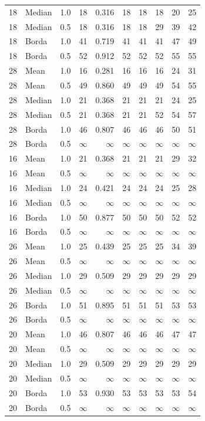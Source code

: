 \documentclass{article}
\begin{document}
\begin{longtable}{llrrr rr r rr}
18 & Median & 1.0 & 18 & 0.316 & 18 & 18 & 18 & 20 & 25 \\
18 & Median & 0.5 & 18 & 0.316 & 18 & 18 & 29 & 39 & 42 \\
18 & Borda & 1.0 & 41 & 0.719 & 41 & 41 & 41 & 47 & 49 \\
18 & Borda & 0.5 & 52 & 0.912 & 52 & 52 & 52 & 55 & 55 \\
28 & Mean & 1.0 & 16 & 0.281 & 16 & 16 & 16 & 24 & 31 \\
28 & Mean & 0.5 & 49 & 0.860 & 49 & 49 & 49 & 54 & 55 \\
28 & Median & 1.0 & 21 & 0.368 & 21 & 21 & 21 & 24 & 25 \\
28 & Median & 0.5 & 21 & 0.368 & 21 & 21 & 52 & 54 & 57 \\
28 & Borda & 1.0 & 46 & 0.807 & 46 & 46 & 46 & 50 & 51 \\
28 & Borda & 0.5 & $\infty$ & $\infty$ & $\infty$ & $\infty$ & $\infty$ & $\infty$ & $\infty$ \\
16 & Mean & 1.0 & 21 & 0.368 & 21 & 21 & 21 & 29 & 32 \\
16 & Mean & 0.5 & $\infty$ & $\infty$ & $\infty$ & $\infty$ & $\infty$ & $\infty$ & $\infty$ \\
16 & Median & 1.0 & 24 & 0.421 & 24 & 24 & 24 & 25 & 28 \\
16 & Median & 0.5 & $\infty$ & $\infty$ & $\infty$ & $\infty$ & $\infty$ & $\infty$ & $\infty$ \\
16 & Borda & 1.0 & 50 & 0.877 & 50 & 50 & 50 & 52 & 52 \\
16 & Borda & 0.5 & $\infty$ & $\infty$ & $\infty$ & $\infty$ & $\infty$ & $\infty$ & $\infty$ \\
26 & Mean & 1.0 & 25 & 0.439 & 25 & 25 & 25 & 34 & 39 \\
26 & Mean & 0.5 & $\infty$ & $\infty$ & $\infty$ & $\infty$ & $\infty$ & $\infty$ & $\infty$ \\
26 & Median & 1.0 & 29 & 0.509 & 29 & 29 & 29 & 29 & 29 \\
26 & Median & 0.5 & $\infty$ & $\infty$ & $\infty$ & $\infty$ & $\infty$ & $\infty$ & $\infty$ \\
26 & Borda & 1.0 & 51 & 0.895 & 51 & 51 & 51 & 53 & 53 \\
26 & Borda & 0.5 & $\infty$ & $\infty$ & $\infty$ & $\infty$ & $\infty$ & $\infty$ & $\infty$ \\
20 & Mean & 1.0 & 46 & 0.807 & 46 & 46 & 46 & 47 & 47 \\
20 & Mean & 0.5 & $\infty$ & $\infty$ & $\infty$ & $\infty$ & $\infty$ & $\infty$ & $\infty$ \\
20 & Median & 1.0 & 29 & 0.509 & 29 & 29 & 29 & 29 & 29 \\
20 & Median & 0.5 & $\infty$ & $\infty$ & $\infty$ & $\infty$ & $\infty$ & $\infty$ & $\infty$ \\
20 & Borda & 1.0 & 53 & 0.930 & 53 & 53 & 53 & 53 & 54 \\
20 & Borda & 0.5 & $\infty$ & $\infty$ & $\infty$ & $\infty$ & $\infty$ & $\infty$ & $\infty$ \\
\bottomrule\end{longtable}
\end{document}
